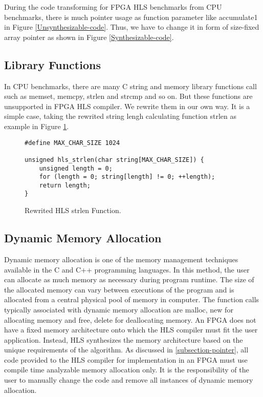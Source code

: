 \documentclass[conference]{IEEEtran}
\begin{document}
During the code transforming for FPGA HLS benchmarks from CPU benchmarks, there is much pointer usage as function parameter like accumulate1 in Figure \ref{Unsynthesizable-code}. Thus, we have to change it in form of size-fixed array pointer as shown in Figure \ref{Synthesizable-code}.

\subsection{Library Functions}
In CPU benchmarks, there are many C string and memory library functions call such as memset, memcpy, strlen and strcmp and so on. But these functions are unsupported in FPGA HLS compiler. We rewrite them in our own way. It is a simple case, taking the rewrited string lengh calculating function strlen as example in Figure \ref{hls_strlen}.

\begin{figure}[h]\centering
{\fontsize{8}{8}\selectfont
\begin{lstlisting}[frame=lines]
#define MAX_CHAR_SIZE 1024

unsigned hls_strlen(char string[MAX_CHAR_SIZE]) {
    unsigned length = 0;
    for (length = 0; string[length] != 0; ++length);
    return length;
}
\end{lstlisting}
}
\caption{Rewrited HLS strlen Function.}\label{hls_strlen}
\end{figure}

\subsection{Dynamic Memory Allocation}\label{section_malloc}
Dynamic memory allocation is one of the memory management techniques available in the C and C++ programming languages. In this method, the user can allocate as much memory as necessary during program runtime. The size of the allocated memory can vary between executions of the program and is allocated from a central physical pool of memory in computer. The function calls typically associated with dynamic memory allocation are malloc, new for allocating memory and free, delete for deallocating memory. An FPGA does not have a fixed memory architecture onto which the HLS compiler must fit the user application. Instead, HLS synthesizes the memory architecture based on the unique requirements of the algorithm. As discussed in \ref{subsection-pointer}, all code provided to the HLS compiler for implementation in an FPGA must use compile time analyzable memory allocation only. It is the responsibility of the user to manually change the code and remove all instances of dynamic memory allocation.
\end{document}

